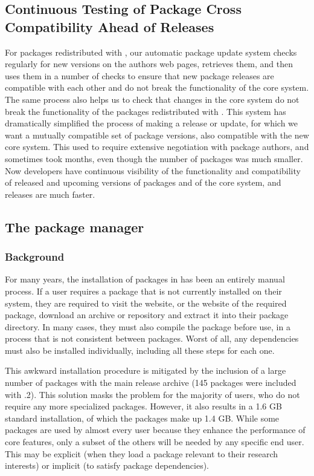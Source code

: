 \subsection{Continuous Testing of Package Cross Compatibility Ahead of
\GAP Releases}
For packages redistributed with \GAP, our automatic package update system
checks regularly for new versions on the authors web pages, retrieves them, and then uses them in a
number of checks to ensure that new package releases are compatible with
each other and do not break the functionality of the core \GAP system. The
same process also helps us to check that changes in the core \GAP system
do not break the functionality of the packages redistributed with \GAP.
This system has dramatically simplified the process of making a \GAP
release or update, for which we want a mutually compatible set of
package versions, also compatible with the new core system. This used
to require extensive negotiation with package authors, and sometimes
took months, even though the number of packages was much smaller. Now
developers have continuous visibility of the functionality and
compatibility of released and upcoming versions of packages and of the
core system, and releases are much faster.


\subsection{The \GAP package manager}\label{pkg-manager}

\subsubsection{Background}

For many years, the installation of packages in \GAP has been an entirely manual
process.  If a user requires a package that is not currently installed on their
system, they are required to visit the \GAP website, or the website of the
required package, download an archive or repository and extract it into their
package directory.  In many cases, they must also compile the package before
use, in a process that is not consistent between packages.  Worst of all, any
dependencies must also be installed individually, including all these steps for
each one.

This awkward installation procedure is mitigated by the inclusion of a large
number of packages with the main release archive (145 packages were included
with .2).  This solution masks the problem for the majority of users,
who do not require any more specialized packages.  However, it also results in a
1.6 GB standard installation, of which the packages make up 1.4 GB.  
While some packages are used by almost every \GAP user because they
enhance the performance of core \GAP features, 
only a subset of the others will be needed by any specific end
user. This may be explicit (when they load a package relevant to their
research interests) or implicit (to satisfy package dependencies).

